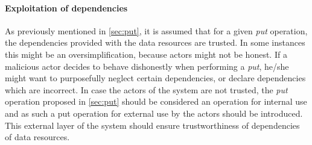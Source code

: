 \paragraph{Exploitation of dependencies} 
As previously mentioned in \autoref{sec:put}, it is assumed that for a given \emph{put} operation, the dependencies provided with the data resources are trusted. In some instances this might be an oversimplification, because actors might not be honest. If a malicious actor decides to behave dishonestly when performing a \emph{put}, he/she might want to purposefully neglect certain dependencies, or declare dependencies which are incorrect. In case the actors of the system are not trusted, the \emph{put} operation proposed in \autoref{sec:put} should be considered an operation for internal use and as such a put operation for external use by the actors should be introduced. This external layer of the system should ensure trustworthiness of dependencies of data resources.
